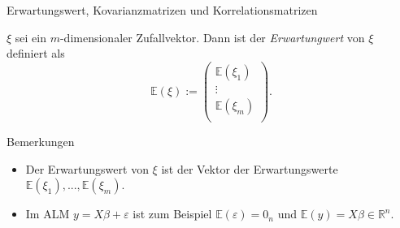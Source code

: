 \documentclass[
  8pt,
  ignorenonframetext,
]{beamer}
\providecommand{\tightlist}{%
  \setlength{\itemsep}{0pt}\setlength{\parskip}{0pt}}
\begin{document}
\begin{frame}{Erwartungswert, Kovarianzmatrizen und
Korrelationsmatrizen}
\protect\hypertarget{erwartungswert-kovarianzmatrizen-und-korrelationsmatrizen-1}{}
\small
\begin{definition}
\justifying
$\xi$ sei ein $m$-dimensionaler Zufallvektor. Dann ist der \textit{Erwartungwert}
von $\xi$ definiert als
\begin{equation}
\mathbb{E}(\xi) :=
\begin{pmatrix}
\mathbb{E}(\xi_1) \\
\vdots  \\
\mathbb{E}(\xi_m) \\
\end{pmatrix}.
\end{equation}
\end{definition}
\footnotesize

Bemerkungen

\begin{itemize}
\tightlist
\item
  Der Erwartungswert von \(\xi\) ist der Vektor der Erwartungswerte
  \(\mathbb{E}(\xi_1), ..., \mathbb{E}(\xi_m)\).
\item
  Im ALM \(y = X\beta + \varepsilon\) ist zum Beispiel
  \(\mathbb{E}(\varepsilon) = 0_n\) und
  \(\mathbb{E}(y) = X\beta \in \mathbb{R}^n\).
\end{itemize}
\end{frame}
\end{document}
